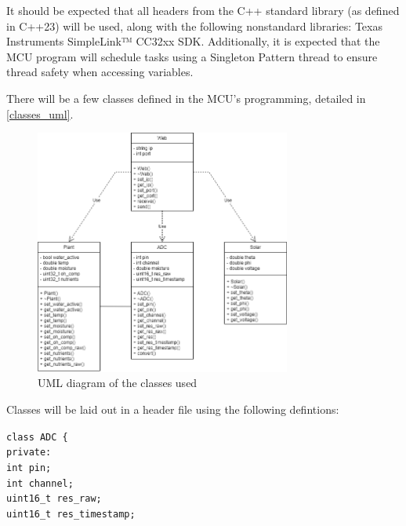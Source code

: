 \begin{flushleft}
    It should be expected that all headers from the C++ standard library (as
    defined in C++23) will be used, along with the following nonstandard
    libraries: Texas Instruments SimpleLink™ CC32xx SDK. Additionally, it is
    expected that the MCU program will schedule tasks using a Singleton Pattern
    thread to ensure thread safety when accessing variables.
\end{flushleft}
\begin{flushleft}
    There will be a few classes defined in the MCU's programming, detailed
    in \autoref{classes_uml}.
    \begin{figure}[H]
        \caption{UML diagram of the classes used}
        \label{classes_uml}
        \centering
        \includegraphics[width=0.75\textwidth]{images/classes_uml.png}
    \end{figure}
    Classes will be laid out in a header file using the following defintions:
    \begin{flushleft}
        \texttt{class ADC \{}  \\
        \quad\texttt{private:} \\
        \quad\quad\texttt{int pin;} \\
        \quad\quad\texttt{int channel;} \\
        \quad\quad\texttt{uint16\_t res\_raw;} \\
        \quad\quad\texttt{uint16\_t res\_timestamp;} \\

\end{flushleft}
\end{flushleft}

